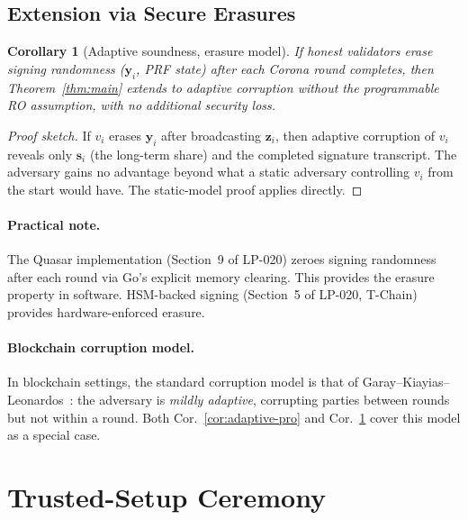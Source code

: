 \documentclass[11pt]{article}
\newtheorem{corollary}[theorem]{Corollary}
\begin{document}
\subsection{Extension via Secure Erasures}

\begin{corollary}[Adaptive soundness, erasure model]
\label{cor:adaptive-erasure}
If honest validators erase signing randomness
($\mathbf{y}_i$, PRF state) after each Corona round completes,
then Theorem~\ref{thm:main} extends to adaptive corruption without
the programmable RO assumption, with no additional security loss.
\end{corollary}

\begin{proof}[Proof sketch]
If $v_i$ erases $\mathbf{y}_i$ after broadcasting $\mathbf{z}_i$,
then adaptive corruption of $v_i$ reveals only $\mathbf{s}_i$ (the
long-term share) and the completed signature transcript.  The
adversary gains no advantage beyond what a static adversary controlling
$v_i$ from the start would have.  The static-model proof applies
directly.
\end{proof}

\paragraph{Practical note.}
The Quasar implementation (Section~9 of LP-020) zeroes signing
randomness after each round via Go's explicit memory clearing.
This provides the erasure property in software.  HSM-backed signing
(Section~5 of LP-020, T-Chain) provides hardware-enforced erasure.

\paragraph{Blockchain corruption model.}
In blockchain settings, the standard corruption model is that of
Garay--Kiayias--Leonardos~\cite{garay2015}: the adversary is
\emph{mildly adaptive}, corrupting parties between rounds but not
within a round.  Both Cor.~\ref{cor:adaptive-pro} and
Cor.~\ref{cor:adaptive-erasure} cover this model as a special
case.

\section{Trusted-Setup Ceremony}
\label{app:setup}
\end{document}
